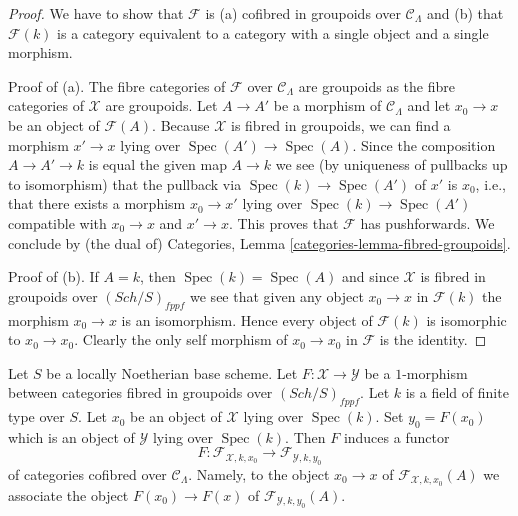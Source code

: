 \documentclass{stacks-project}
\theoremstyle{plain}
\theoremstyle{definition}
\theoremstyle{remark}
\numberwithin{equation}{subsection}
\def\Spec{\mathop{\mathrm{Spec}}}
\def\Sch{\mathit{Sch}}
\begin{document}
\begin{proof}
We have to show that $\mathcal{F}$ is (a) cofibred in groupoids over
$\mathcal{C}_\Lambda$ and (b) that $\mathcal{F}(k)$ is a category equivalent
to a category with a single object and a single morphism.

\medskip\noindent
Proof of (a). The fibre categories of $\mathcal{F}$
over $\mathcal{C}_\Lambda$ are groupoids as the fibre categories
of $\mathcal{X}$ are groupoids. Let $A \to A'$ be a morphism of
$\mathcal{C}_\Lambda$ and let $x_0 \to x$ be an object of $\mathcal{F}(A)$.
Because $\mathcal{X}$ is fibred in groupoids, we can find a morphism
$x' \to x$ lying over $\Spec(A') \to \Spec(A)$. Since the composition
$A \to A' \to k$ is equal the given map $A \to k$ we see (by uniqueness
of pullbacks up to isomorphism) that the pullback via $\Spec(k) \to \Spec(A')$
of $x'$ is $x_0$, i.e., that there exists a morphism $x_0 \to x'$
lying over $\Spec(k) \to \Spec(A')$ compatible with
$x_0 \to x$ and $x' \to x$. This proves that $\mathcal{F}$ has
pushforwards. We conclude by (the dual of)
Categories, Lemma \ref{categories-lemma-fibred-groupoids}.

\medskip\noindent
Proof of (b). If $A = k$, then $\Spec(k) = \Spec(A)$ and since $\mathcal{X}$
is fibred in groupoids over $(\Sch/S)_{fppf}$ we see that given any object
$x_0 \to x$ in $\mathcal{F}(k)$ the morphism $x_0 \to x$ is an isomorphism.
Hence every object of $\mathcal{F}(k)$ is isomorphic to $x_0 \to x_0$.
Clearly the only self morphism of $x_0 \to x_0$ in $\mathcal{F}$ is
the identity.
\end{proof}

\noindent
Let $S$ be a locally Noetherian base scheme. Let
$F : \mathcal{X} \to \mathcal{Y}$ be a $1$-morphism between categories
fibred in groupoids over $(\Sch/S)_{fppf}$. Let $k$ is a field
of finite type over $S$. Let $x_0$ be an object of $\mathcal{X}$ lying
over $\Spec(k)$. Set $y_0 = F(x_0)$ which is an object of $\mathcal{Y}$
lying over $\Spec(k)$. Then $F$ induces a functor
\begin{equation}
\label{equation-functoriality}
F :
\mathcal{F}_{\mathcal{X}, k, x_0}
\longrightarrow
\mathcal{F}_{\mathcal{Y}, k, y_0}
\end{equation}
of categories cofibred over $\mathcal{C}_\Lambda$. Namely, to the object
$x_0 \to x$ of $\mathcal{F}_{\mathcal{X}, k, x_0}(A)$ we associate
the object $F(x_0) \to F(x)$ of $\mathcal{F}_{\mathcal{Y}, k, y_0}(A)$.
\end{document}
